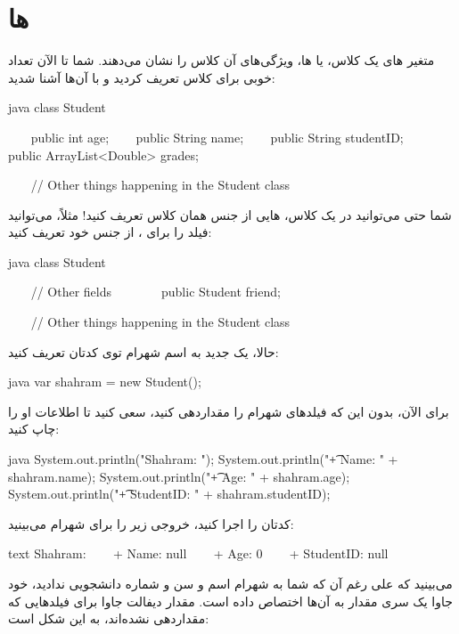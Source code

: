 \section{ ها}

متغیر های یک کلاس، یا  ها، ویژگی‌های آن کلاس را نشان می‌دهند.
شما تا الآن تعداد خوبی  برای کلاس  تعریف کردید و
با آن‌ها آشنا شدید:

\begin{codebox}{java}
class Student {
    public int age;
    public String name;
    public String studentID;
    public ArrayList<Double> grades;

    // Other things happening in the Student class

}
\end{codebox}

شما حتی می‌توانید در یک کلاس،  هایی از جنس همان کلاس تعریف
کنید! مثلاً، می‌توانید فیلد  را برای  ، از
جنس خود  تعریف کنید:

\begin{codebox}{java}
class Student {
    // Other fields
    
    public Student friend;

    // Other things happening in the Student class

}
\end{codebox}

حالا، یک  جدید به اسم شهرام توی کدتان تعریف کنید:

\begin{codebox}{java}
var shahram = new Student();
\end{codebox}

برای الآن، بدون این که فیلدهای شهرام را مقداردهی کنید، سعی کنید تا
اطلاعات او را چاپ کنید:

\begin{codebox}{java}
System.out.println("Shahram: ");  
System.out.println("\t+ Name: " + shahram.name);  
System.out.println("\t+ Age: " + shahram.age);  
System.out.println("\t+ StudentID: " + shahram.studentID);
\end{codebox}

کدتان را اجرا کنید، خروجی زیر را برای شهرام می‌بینید:

\begin{codebox}{text}
Shahram:  
    + Name: null  
    + Age: 0  
    + StudentID: null
\end{codebox}

می‌بینید که علی رغم آن که شما به شهرام اسم و سن و شماره دانشجویی ندادید،
خود جاوا یک سری مقدار به آن‌ها اختصاص داده است. مقدار دیفالت جاوا برای
فیلدهایی که مقداردهی نشده‌اند، به این شکل است:

